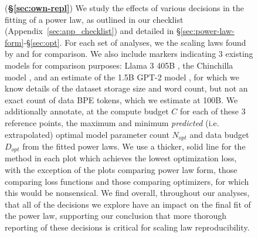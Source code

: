 \begin{figure}[]
\ContinuedFloat
\centering 

\caption{(\textbf{\S\ref{sec:own-repl}}) We study the effects of various decisions in the fitting of a power law, as outlined in our checklist (Appendix~\ref{sec:app_checklist}) and detailed in \S\ref{sec:power-law-form}-\S\ref{sec:opt}. For each set of analyses, we the scaling laws found by \citep{kaplan2020scaling} and \citep{hoffmann2022training} for comparison. We also include markers indicating 3 existing models for comparison purposes: Llama 3 405B \citep{dubey2024llama}, the Chinchilla model \citep{hoffmann2022training}, and an estimate of the 1.5B GPT-2 model \citep{radford2019language}, for which we know details of the dataset storage size and word count, but not an exact count of data BPE tokens, which we estimate at 100B. We additionally annotate, at the compute budget $C$ for each of these 3 reference points, the maximum and minimum \textit{predicted} (i.e. extrapolated) optimal model parameter count $N_{opt}$ and data budget $D_{opt}$ from the fitted power laws. We use a thicker, solid line for the method in each plot which achieves the lowest optimization loss, with the exception of the plots comparing power law form, those comparing loss functions and those comparing optimizers, for which this would be nonsensical.
We find overall, throughout our analyses, that all of the decisions we explore have an impact on the final fit of the power law, supporting our conclusion that more thorough reporting of these decisions is critical for scaling law reproducibility.
}
\label{fig:overall}
\end{figure}